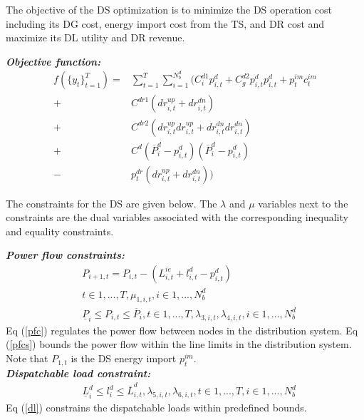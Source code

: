 The objective of the DS optimization is to minimize the DS operation cost including its DG cost,  energy import cost from the TS, and DR cost and maximize its DL utility and DR revenue.

\textbf{\emph{Objective function:}}
\begin{align*}
f(\{y_t\}^{T}_{t=1}) =& \sum_{t=1}^{T}\sum_{i=1}^{N^d_b}(C^{d1}_i p^d_{i,t} +C^{d2}_g p^d_{i,t}  p^d_{i,t} +p^{im}_{t}c^{im}_{t}\\
+ &C^{dr1} (dr^{up}_{i,t} + dr^{dn}_{i,t} ) \\
+ &C^{dr2} (dr^{up}_{i,t}dr^{up}_{i,t} + dr^{dn}_{i,t}dr^{dn}_{i,t}  ) \\
+ &C^{d}(\overline{P}^d_{i}-p^d_{i,t})(\overline{P}^d_{i}-p^d_{i,t})\\
- &p^{dr}_{t}(dr_{i,t}^{up}+dr_{i,t}^{dn}))
\end{align*}

The constraints for the DS are given below. The $\lambda$ and $\mu$ variables next to the constraints are the dual variables associated with the corresponding inequality and equality constraints.


\textbf{\emph{Power flow constraints:} }
\begin{align}
& P_{i+1,t} = P_{i,t} - (L^{ie}_{i,t} + l^d_{i,t} - p^d_{i,t}) \nonumber\\
& t\in{1,...,T} ,\mu_{1,i,t},i\in{1,...,N_b^d}  \label{pfc}\\
&  \underline P_{i} \leq P_{i,t} \leq  \overline P_{i}, t\in{1,...,T}, \lambda_{3,i,t},\lambda_{4,i,t}, i\in{1,...,N_b^d}\label{pfcs}
\end{align}
Eq (\ref{pfc}) regulates the power flow between nodes in the distribution system. Eq (\ref{pfcs}) bounds the power flow within the line limits in the distribution system. Note that $P_{1,t}$ is the DS energy import $p^{im}_t$. \\

\textbf{\emph{Dispatchable load constraint:} }
\begin{align}
&\underline{L}^d_{i}\leq l^d_{i}\leq \overline{L}^d_{i,t}\label{dl}, \lambda_{5,i,t},\lambda_{6,i,t},t\in{1,...,T},i\in{1,...,N_b^d} 
\end{align} 
Eq (\ref{dl}) constrains the dispatchable loads within predefined bounds. 

